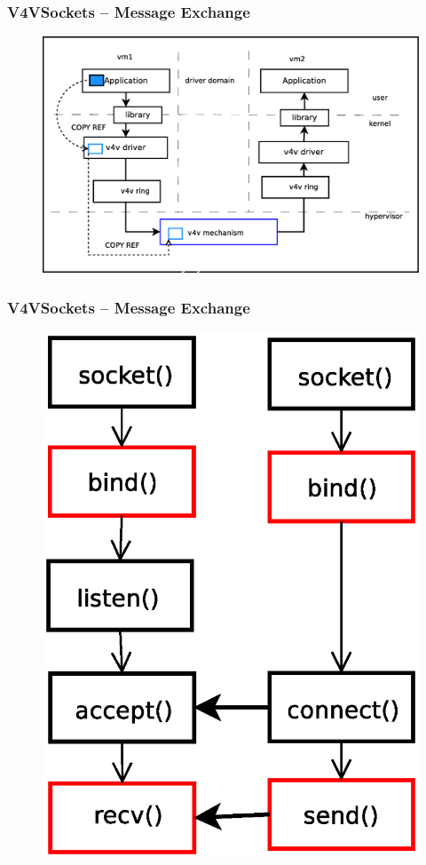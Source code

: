\documentclass[red,slidestop,notes,compress,mathserif]{beamer}
\begin{document}
\begin{frame}
\frametitle{V4VSockets -- Message Exchange}
\begin{figure}
\includegraphics[scale=0.30]{figures/v4vsockets3.eps}
\end{figure}
\end{frame}


\begin{frame}
\frametitle{V4VSockets -- Message Exchange}
\begin{figure}
\includegraphics[scale=0.30]{figures/sockets2.eps}
\end{figure}
\end{frame}
\end{document}
